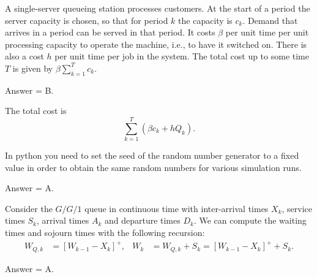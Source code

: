 \begin{exercise}[201903]
 A single-server queueing station processes customers.
 At the start of a period the server capacity is chosen, so that for period $k$ the capacity is $c_k$.
 Demand that arrives in a period can be served in that period.
 It costs $\beta$ per unit time per unit processing capacity to operate the machine, i.e., to have it switched on.
 There is also a cost $h$ per unit time per job in the system.
 The total cost up to some time $T$ is given by $\beta \sum_{k=1}^T c_k$.
\begin{solution}
Answer = B.

The total cost is
 \begin{equation*}
 \sum_{k=1}^T \left(\beta c_k + h Q_k\right).
 \end{equation*}

\end{solution}
\end{exercise}

\begin{exercise}[201903]
In python you need to set the seed of the random number generator to a fixed value in order to obtain the same random numbers for various simulation runs. 
\begin{solution}
Answer = A.
\end{solution}
\end{exercise}

\begin{exercise}[201903]
Consider the $G/G/1$ queue in continuous time with inter-arrival times $X_k$, service times $S_k$, arrival times $A_k$ and departure times $D_k$. We can compute the waiting times and sojourn times with the following recursion:
\begin{align}
 W_{Q,k} &= [W_{k-1} - X_k]^+, &
 W_{k} &= W_{Q,k} + S_k = [W_{k-1} - X_k]^+ + S_k.
\end{align}

\begin{solution}
Answer = A.
\end{solution}
\end{exercise}



